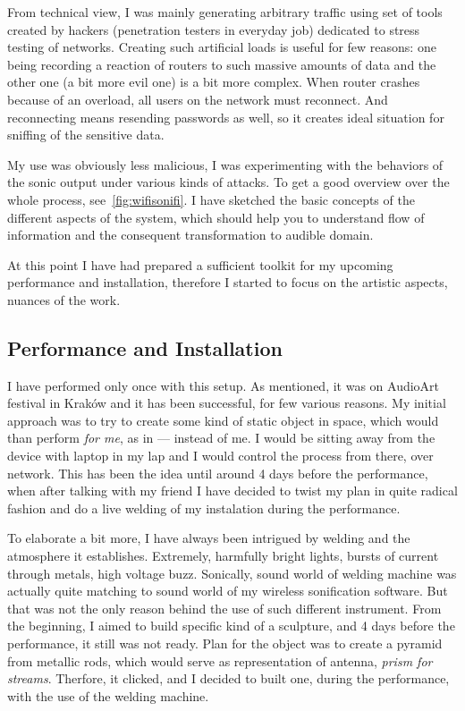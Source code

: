 \documentclass[12pt,a4paper,oneside]{report}
\begin{document}
From technical view, I was mainly generating arbitrary traffic using set of tools created by hackers (penetration testers in everyday job) dedicated to stress testing of networks. Creating such artificial loads is useful for few reasons: one being recording a reaction of routers to such massive amounts of data and the other one (a bit more evil one) is a bit more complex. When router crashes because of an overload, all users on the network must reconnect. And reconnecting means resending passwords as well, so it creates ideal situation for sniffing of the sensitive data.

My use was obviously less malicious, I was experimenting with the behaviors of the sonic output under various kinds of attacks. To get a good overview over the whole process, see~\ref{fig:wifisonifi}. I have sketched the basic concepts of the different aspects of the system, which should help you to understand flow of information and the consequent transformation to audible domain.

At this point I have had prepared a sufficient toolkit for my upcoming performance and installation, therefore I started to focus on the artistic aspects, nuances of the work.

\subsection{Performance and Installation}
I have performed only once with this setup. As mentioned, it was on AudioArt festival in Kraków and it has been successful, for few various reasons. My initial approach was to try to create some kind of static object in space, which would than perform \emph{for me}, as in --- instead of me. I would be sitting away from the device with laptop in my lap and I would control the process from there, over network. This has been the idea until around 4 days before the performance, when after talking with my friend I have decided to twist my plan in quite radical fashion and do a live welding of my instalation during the performance.

To elaborate a bit more, I have always been intrigued by welding and the atmosphere it establishes. Extremely, harmfully bright lights, bursts of current through metals, high voltage buzz. Sonically, sound world of welding machine was actually quite matching to sound world of my wireless sonification software. But that was not the only reason behind the use of such different instrument. From the beginning, I aimed to build specific kind of a sculpture, and 4 days before the performance, it still was not ready. Plan for the object was to create a pyramid from metallic rods, which would serve as representation of antenna, \textit{prism for streams}. Therfore, it clicked, and I decided to built one, during the performance, with the use of the welding machine.
\end{document}
